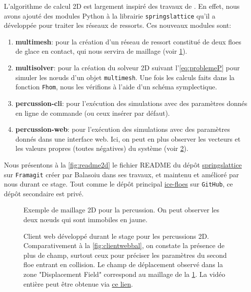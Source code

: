 L'algorithme de calcul 2D est largement inspiré des travaux de \citeauthor{balasoiu2020halthesis}. En effet, nous avons ajouté des modules Python à la librairie \texttt{springslattice} qu'il a développée pour traiter les réseaux de ressorts. Ces nouveaux modules sont:
\begin{enumerate}
    \item \textbf{multimesh}: pour la création d'un réseau de ressort constitué de deux floes de glace en contact, qui nous servira de maillage (voir \cref{fig:percussion2d}).
    \item \textbf{multisolver}: pour la création du solveur 2D suivant l'\cref{eq:problemeP} pour simuler les n\oe{}uds d'un objet \texttt{multimesh}. Une fois les calculs faits dans la fonction \texttt{Fhom}, nous les vérifions à l'aide d'un schéma symplectique.
    \item \textbf{percussion-cli}: pour l'exécution des simulations avec des paramètres donnés en ligne de commande (ou ceux insérer par défaut).
    \item \textbf{percussion-web}: pour l'exécution des simulations avec des paramètres donnés dans une interface web. Ici, on peut en plus observer les vecteurs et les valeurs propres (toutes négatives) du système (voir \cref{fig:clientwebmoi}).
\end{enumerate}


Nous présentons à la \cref{fig:readme2d} le fichier README du dépôt \href{https://framagit.org/RaK/SimuRessorts}{springslattice} sur \texttt{Framagit} créer par Balasoiu dans ses travaux, et maintenu et amélioré par nous durant ce stage. Tout comme le dépôt principal \href{https://github.com/desmond-rn/ice-floes}{ice-floes} sur \texttt{GitHub}, ce dépôt secondaire est privé.



\begin{figure}[H]
    \centering
    \caption{Exemple de maillage 2D pour la percussion. On peut observer les deux n\oe{}uds qui sont immobiles en jaune.}
    \label{fig:percussion2d}
\end{figure}


\begin{figure}[H]
    \centering
    \caption{Client web développé durant le stage pour les percussions 2D. Comparativement à la \cref{fig:clientwebbal}, on constate la présence de plus de champ, surtout ceux pour préciser les paramètres du second floe entrant en collision. Le champ de déplacement observé dans la zone "Displacement Field" correspond au maillage de la \cref{fig:percussion2d}. La vidéo entière peut être obtenue via \href{https://seafile.unistra.fr/f/5e9baa748e89426eb017/}{ce lien}.}
    \label{fig:clientwebmoi}
\end{figure}



